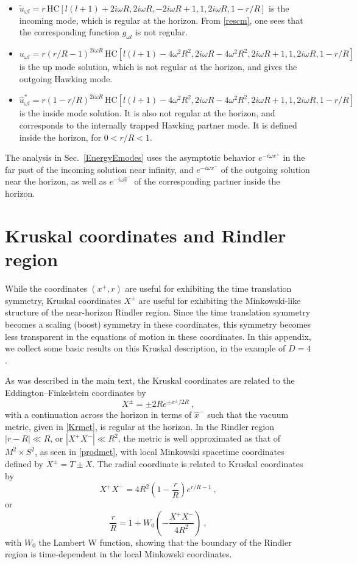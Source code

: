 \documentclass[11pt]{article}
\numberwithin{equation}{section}
\newcommand{\beq}{\begin{equation}}
\newcommand{\eeq}{\end{equation}}
\begin{document}
\begin{itemize}
\item $\tilde{u}_{\omega l} = r \, \mathrm{HC}[l(l+1)+2 i \omega R, 2 i \omega R, -2 i \omega R + 1, 1, 2 i \omega R, 1-r/R]$ is the incoming mode, which is regular at the horizon. From \eqref{rescm}, one sees that the corresponding function $g_{\omega l}$ is not regular.

\item $u_{\omega l} = r(r/R-1)^{2i\omega R} \, \mathrm{HC}[l(l + 1) - 4 \omega^2R^2, 2 i \omega R - 4 \omega^2R^2, 2 i \omega R + 1, 1, 2 i \omega R, 1-r/R]$ is the up mode solution, which is not regular at the horizon, and gives the outgoing Hawking mode.

\item $\hat{u}_{\omega l}^* = r(1-r/R)^{2i\omega R} \, \mathrm{HC}[l(l + 1) - 4 \omega^2R^2, 2 i \omega R - 4 \omega^2R^2, 2 i \omega R + 1, 1, 2 i \omega R,  1-r/R]$ is the inside mode solution. It is also not regular at the horizon, and corresponds to the internally trapped Hawking partner mode. It is defined inside the horizon, for $0<r/R<1$.
\end{itemize}
The analysis in Sec.~\ref{EnergyEmodes} uses the asymptotic behavior  $e^{-i\omega x^+}$ in the far past of the incoming solution near infinity, and  $e^{-i\omega x^-}$ of the outgoing solution near the horizon, as well as $e^{-i\omega \hat{x}^-}$ of the corresponding partner  inside the horizon.

\section{Kruskal coordinates and Rindler region}
\label{Kapp}

While the coordinates $(x^+,r)$ are useful for exhibiting the time translation symmetry, Kruskal coordinates $X^\pm$ are useful for exhibiting the Minkowski-like structure of the near-horizon Rindler region.  Since the time translation symmetry becomes a scaling (boost) symmetry in these coordinates, this symmetry becomes less transparent in the equations of motion in these coordinates.  In this appendix, we collect some basic results on this Kruskal description, in the example of $D=4$.

As was described in the main text, the Kruskal coordinates are related to the Eddington--Finkelstein coordinates by
\beq\label{Kcoorddef}
X^{\pm} = \pm 2R e^{\pm{ x^{\pm}}/{2R}}\ ,
\eeq
with a continuation across the horizon in terms of $\hat x^-$ such that the vacuum metric, given in \eqref{Krmet},  is regular at the horizon.  
In the Rindler region $|r-R|\ll R$, or $|X^+X^-|\ll R^2$, the metric is well approximated as that of $M^2\times S^2$, as seen in \eqref{prodmet}, with local Minkowski spacetime coordinates defined by $X^\pm=T\pm X$.  The radial coordinate is related to Kruskal coordinates by
\beq
X^+X^-=4R^2 \left(1-\frac{r}{R}\right) e^{r/R-1}\ ,
\eeq
or
\beq\label{rtoK}
\frac{r}{R}= 1+ W_0\left(-\frac{X^+X^-}{4R^2 }\right)\ ,
\eeq
with $W_0$ the Lambert W function, showing that the boundary of the Rindler region is time-dependent in the local Minkowski coordinates.  
\end{document}
